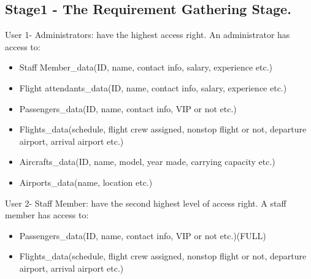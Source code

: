 \documentclass[10pt,conference]{IEEEtran}
\begin{document}
\subsection{Stage1 - The Requirement Gathering Stage. }\label{sec:1.	Requirement Gathering Stage. }

User 1- Administrators: have the highest access right. An administrator has access to:
\begin{itemize}
\item Staff Member\_data(ID, name, contact info, salary, experience etc.)
\end{itemize}

\begin{itemize}
\item Flight attendants\_data(ID, name, contact info, salary, experience etc.)
\end{itemize}

\begin{itemize}
\item Passengers\_data(ID, name, contact info, VIP or not etc.)
\end{itemize}

\begin{itemize}
\item Flights\_data(schedule, flight crew assigned, nonstop flight or not, departure airport, arrival airport etc.)
\end{itemize}

\begin{itemize}
\item Aircrafts\_data(ID, name, model, year made, carrying capacity etc.)
\end{itemize}

\begin{itemize}
\item Airports\_data(name, location etc.)
\end{itemize}






User 2- Staff Member: have the second highest level of access right. A staff member has access to:
\begin{itemize}
\item Passengers\_data(ID, name, contact info, VIP or not etc.)(FULL)
\end{itemize}

\begin{itemize}
\item Flights\_data(schedule, flight crew assigned, nonstop flight or not, departure airport, arrival airport etc.)
\end{itemize}
\end{document}
